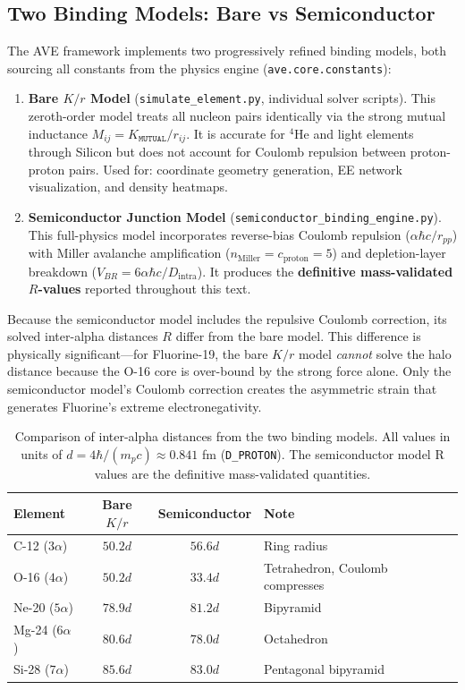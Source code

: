 \subsection{Two Binding Models: Bare vs Semiconductor}
\label{sec:two_models}

The AVE framework implements two progressively refined binding models, both sourcing all constants from the physics engine (\texttt{ave.core.constants}):

\begin{enumerate}
    \item \textbf{Bare $K/r$ Model} (\texttt{simulate\_element.py}, individual solver scripts). This zeroth-order model treats all nucleon pairs identically via the strong mutual inductance $M_{ij} = K_{\texttt{MUTUAL}} / r_{ij}$. It is accurate for $^4$He and light elements through Silicon but does not account for Coulomb repulsion between proton-proton pairs. Used for: coordinate geometry generation, EE network visualization, and density heatmaps.

    \item \textbf{Semiconductor Junction Model} (\texttt{semiconductor\_binding\_engine.py}). This full-physics model incorporates reverse-bias Coulomb repulsion ($\alpha\hbar c / r_{pp}$) with Miller avalanche amplification ($n_{\text{Miller}} = c_{\text{proton}} = 5$) and depletion-layer breakdown ($V_{BR} = 6\alpha\hbar c / D_{\text{intra}}$). It produces the \textbf{definitive mass-validated $R$-values} reported throughout this text.
\end{enumerate}

Because the semiconductor model includes the repulsive Coulomb correction, its solved inter-alpha distances $R$ differ from the bare model. This difference is physically significant---for Fluorine-19, the bare $K/r$ model \textit{cannot} solve the halo distance because the O-16 core is over-bound by the strong force alone. Only the semiconductor model's Coulomb correction creates the asymmetric strain that generates Fluorine's extreme electronegativity.

\begin{table}[htbp]
\centering
\caption{Comparison of inter-alpha distances from the two binding models. All values in units of $d = 4\hbar/(m_p c) \approx 0.841$ fm (\texttt{D\_PROTON}). The semiconductor model R values are the definitive mass-validated quantities.}
\label{tab:model_comparison}
\begin{tabularx}{\textwidth}{@{}l c c X@{}}
\hline
\textbf{Element} & \textbf{Bare $K/r$} & \textbf{Semiconductor} & \textbf{Note} \\
\hline
C-12 ($3\alpha$) & $50.2d$ & $56.6d$ & Ring radius \\
O-16 ($4\alpha$) & $50.2d$ & $33.4d$ & Tetrahedron, Coulomb compresses \\
Ne-20 ($5\alpha$) & $78.9d$ & $81.2d$ & Bipyramid \\
Mg-24 ($6\alpha$) & $80.6d$ & $78.0d$ & Octahedron \\
Si-28 ($7\alpha$) & $85.6d$ & $83.0d$ & Pentagonal bipyramid \\
\hline
\end{tabularx}
\end{table}

